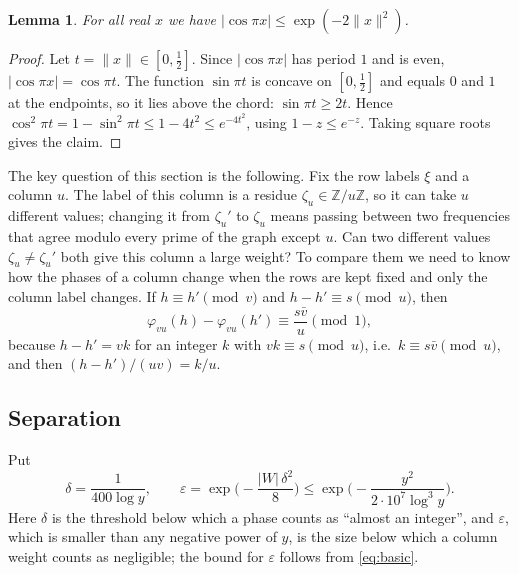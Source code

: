 \documentclass[11pt]{amsart}
\newtheorem{lemma}[theorem]{Lemma}
\theoremstyle{definition}
\theoremstyle{remark}
\newcommand{\Z}{\mathbb{Z}}
\newcommand{\nint}[1]{\lVert #1\rVert}
\begin{document}
\begin{lemma}\label{lem:cos}
For all real $x$ we have $|\cos\pi x|\le\exp(-2\nint{x}^2)$.
\end{lemma}
\begin{proof}
Let $t=\nint{x}\in[0,\frac12]$. Since $|\cos\pi x|$ has period $1$ and is even, $|\cos\pi x|=\cos\pi t$. The function $\sin\pi t$ is concave on $[0,\frac12]$ and equals $0$ and $1$ at the endpoints, so it lies above the chord: $\sin\pi t\ge2t$. Hence $\cos^2\pi t=1-\sin^2\pi t\le1-4t^2\le e^{-4t^2}$, using $1-z\le e^{-z}$. Taking square roots gives the claim.
\end{proof}

The key question of this section is the following. Fix the row labels $\xi$ and a column $u$. The label of this column is a residue $\zeta_u\in\Z/u\Z$, so it can take $u$ different values; changing it from $\zeta_u'$ to $\zeta_u$ means passing between two frequencies that agree modulo every prime of the graph except $u$. Can two different values $\zeta_u\ne\zeta_u'$ both give this column a large weight? To compare them we need to know how the phases of a column change when the rows are kept fixed and only the column label changes. If $h\equiv h'\pmod v$ and $h-h'\equiv s\pmod u$, then
\begin{equation}\label{eq:pf}
 \varphi_{vu}(h)-\varphi_{vu}(h')\equiv\frac{s\bar v}u\pmod1,
\end{equation}
because $h-h'=vk$ for an integer $k$ with $vk\equiv s\pmod u$, i.e.\ $k\equiv s\bar v\pmod u$, and then $(h-h')/(uv)=k/u$.

\subsection{Separation}
Put
\[
 \delta=\frac{1}{400\log y},\qquad \varepsilon=\exp\Big(-\frac{|W|\,\delta^2}{8}\Big)\le\exp\Big(-\frac{y^2}{2\cdot10^7\log^3y}\Big).
\]
Here $\delta$ is the threshold below which a phase counts as ``almost an integer'', and $\varepsilon$, which is smaller than any negative power of $y$, is the size below which a column weight counts as negligible; the bound for $\varepsilon$ follows from \eqref{eq:basic}.
\end{document}
